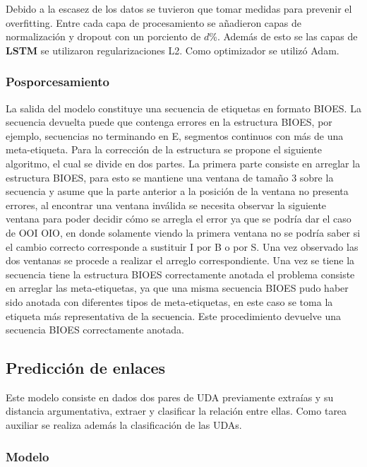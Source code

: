 Debido a la escasez de los datos se tuvieron que tomar medidas para prevenir el overfitting. Entre cada capa de 
procesamiento se añadieron capas de normalización y dropout con un porciento de $d$\%. Además de esto se 
las capas de \textbf{LSTM} se utilizaron regularizaciones L2. Como optimizador se utilizó Adam.

\subsubsection{Posporcesamiento}

La salida del modelo constituye una secuencia de etiquetas en formato BIOES. La secuencia devuelta puede que contenga
errores en la estructura BIOES, por ejemplo, secuencias no terminando en E, segmentos continuos con más de una meta-etiqueta.
Para la corrección de la estructura se propone el siguiente algoritmo, el cual se divide en dos partes. La primera
parte consiste en arreglar la estructura BIOES, para esto se mantiene una ventana de tamaño
3 sobre la secuencia y asume que la parte anterior a la posición de la ventana no presenta errores, al encontrar una
ventana inválida se necesita observar la siguiente ventana para poder decidir cómo se arregla el error ya que se
podría dar el caso de OOI OIO, en donde solamente viendo la primera ventana no se podría saber si el cambio 
correcto corresponde a sustituir I por B o por S. Una vez observado las dos ventanas se procede a realizar el 
arreglo correspondiente. Una vez se tiene la secuencia tiene la estructura BIOES correctamente anotada el problema
consiste en arreglar las meta-etiquetas, ya que una misma secuencia BIOES pudo haber sido anotada con diferentes
tipos de meta-etiquetas, en este caso se toma la etiqueta más representativa de la secuencia. Este procedimiento
devuelve una secuencia BIOES correctamente anotada.

\subsection{Predicción de enlaces}

Este modelo consiste en dados dos pares de UDA previamente extraías y su distancia argumentativa, 
extraer y clasificar la relación entre ellas. Como tarea auxiliar se realiza además la clasificación 
de las UDAs.

\subsubsection{Modelo}

